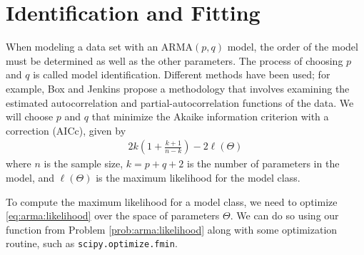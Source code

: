 \section*{Identification and Fitting}

When modeling a data set with an $\text{ARMA}(p,q)$ model, the order of the
model must be determined as well as the other parameters. The process of
choosing $p$ and $q$ is called model identification. Different methods have
been used; for example, Box and Jenkins propose a methodology that involves
examining the estimated autocorrelation and partial-autocorrelation functions
of the data. We will choose $p$ and $q$ that minimize the Akaike information
criterion with a correction (AICc), given by
\begin{align}
    2k\left(1 + \frac{k+1}{n-k}\right) - 2 \ell(\Theta)
\end{align}
where $n$ is the sample size, $k = p + q + 2$ is the number of parameters in
the model, and $\ell(\Theta)$ is the maximum likelihood for the model class.

To compute the maximum likelihood for a model class, we need to optimize
\ref{eq:arma:likelihood} over the space of parameters $\Theta$. We can do so
using our function from Problem \ref{prob:arma:likelihood} along with some
optimization routine, such as {\tt scipy.optimize.fmin}.

